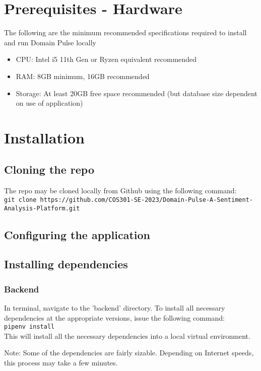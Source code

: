 \documentclass{article}
\newcommand{\code}[1]{\colorbox{light-gray}{\texttt{#1}}}
\begin{document}
\section{Prerequisites - Hardware}
The following are the minimum recommended specifications required to install and run Domain Pulse locally
\begin{itemize}
    \item CPU: Intel i5 11th Gen or Ryzen equivalent recommended
    \item RAM: 8GB minimum, 16GB recommended
    \item Storage: At least 20GB free space recommended (but database size dependent on use of application)
\end{itemize}


\section{Installation}

\subsection{Cloning the repo}
The repo may be cloned locally from Github using the following command: \\
\code{git clone https://github.com/COS301-SE-2023/Domain-Pulse-A-Sentiment-Analysis-Platform.git}


\subsection{Configuring the application}


\subsection{Installing dependencies}
\subsubsection{Backend}
In terminal, navigate to the 'backend' directory. To install all necessary dependencies at the appropriate versions, issue the following
command: \\
\code{pipenv install}\\
This will install all the necessary dependencies into a local virtual environment.

Note: Some of the dependencies are fairly sizable. Depending on Internet speeds, this process may take a few minutes.
\end{document}
